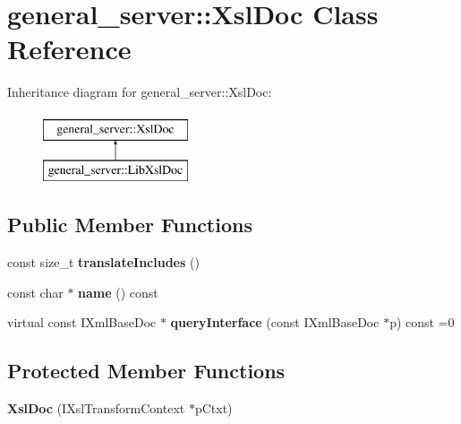 \hypertarget{classgeneral__server_1_1XslDoc}{\section{general\-\_\-server\-:\-:\-Xsl\-Doc \-Class \-Reference}
\label{classgeneral__server_1_1XslDoc}
}
\-Inheritance diagram for general\-\_\-server\-:\-:\-Xsl\-Doc\-:\begin{figure}[H]
\begin{center}
\leavevmode
\includegraphics[height=2.000000cm]{classgeneral__server_1_1XslDoc}
\end{center}
\end{figure}
\subsection*{\-Public \-Member \-Functions}
\begin{DoxyCompactItemize}
\item 
\hypertarget{classgeneral__server_1_1XslDoc_a4c7afb6a961df4fd025fcb1132fb5ce6}{const size\-\_\-t {\bfseries translate\-Includes} ()}\label{classgeneral__server_1_1XslDoc_a4c7afb6a961df4fd025fcb1132fb5ce6}

\item 
\hypertarget{classgeneral__server_1_1XslDoc_a61fe660161c1f9f07dda3586a7a09754}{const char $\ast$ {\bfseries name} () const }\label{classgeneral__server_1_1XslDoc_a61fe660161c1f9f07dda3586a7a09754}

\item 
\hypertarget{classgeneral__server_1_1XslDoc_ab7d7405e7021eff6b6db01d87dedf626}{virtual const \-I\-Xml\-Base\-Doc $\ast$ {\bfseries query\-Interface} (const \-I\-Xml\-Base\-Doc $\ast$p) const =0}\label{classgeneral__server_1_1XslDoc_ab7d7405e7021eff6b6db01d87dedf626}

\end{DoxyCompactItemize}
\subsection*{\-Protected \-Member \-Functions}
\begin{DoxyCompactItemize}
\item 
\hypertarget{classgeneral__server_1_1XslDoc_aba6c8af298143cb78fc07814a425a751}{{\bfseries \-Xsl\-Doc} (\-I\-Xsl\-Transform\-Context $\ast$p\-Ctxt)}\label{classgeneral__server_1_1XslDoc_aba6c8af298143cb78fc07814a425a751}

\end{DoxyCompactItemize}

